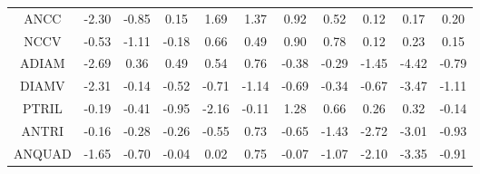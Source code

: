 \documentclass[11pt,a4paper]{report}
\begin{document}
\begin{longtable}{ | c || c | c | c | c | c | c | c | c | c || c |}
ANCC &  \cellcolor[HTML]{FFC7C7} -2.30 &  \cellcolor[HTML]{FFE7E7} -0.85 &  \cellcolor[HTML]{FFFFFF} 0.15 &  \cellcolor[HTML]{D7D7FF} 1.69 &  \cellcolor[HTML]{DFDFFF} 1.37 &  \cellcolor[HTML]{E7E7FF} 0.92 &  \cellcolor[HTML]{EFEFFF} 0.52 &  \cellcolor[HTML]{FFFFFF} 0.12 &  \cellcolor[HTML]{F7F7FF} 0.17 &  \cellcolor[HTML]{F7F7FF} 0.20 \\
NCCV &  \cellcolor[HTML]{FFEFEF} -0.53 &  \cellcolor[HTML]{FFE7E7} -1.11 &  \cellcolor[HTML]{FFF7F7} -0.18 &  \cellcolor[HTML]{EFEFFF} 0.66 &  \cellcolor[HTML]{EFEFFF} 0.49 &  \cellcolor[HTML]{E7E7FF} 0.90 &  \cellcolor[HTML]{EFEFFF} 0.78 &  \cellcolor[HTML]{FFFFFF} 0.12 &  \cellcolor[HTML]{F7F7FF} 0.23 &  \cellcolor[HTML]{FFFFFF} 0.15 \\
ADIAM &  \cellcolor[HTML]{FFBFBF} -2.69 &  \cellcolor[HTML]{F7F7FF} 0.36 &  \cellcolor[HTML]{EFEFFF} 0.49 &  \cellcolor[HTML]{EFEFFF} 0.54 &  \cellcolor[HTML]{EFEFFF} 0.76 &  \cellcolor[HTML]{FFF7F7} -0.38 &  \cellcolor[HTML]{FFF7F7} -0.29 &  \cellcolor[HTML]{FFD7D7} -1.45 &  \cellcolor[HTML]{FF8F8F} -4.42 &  \cellcolor[HTML]{FFEFEF} -0.79 \\
DIAMV &  \cellcolor[HTML]{FFC7C7} -2.31 &  \cellcolor[HTML]{FFFFFF} -0.14 &  \cellcolor[HTML]{FFEFEF} -0.52 &  \cellcolor[HTML]{FFEFEF} -0.71 &  \cellcolor[HTML]{FFDFDF} -1.14 &  \cellcolor[HTML]{FFEFEF} -0.69 &  \cellcolor[HTML]{FFF7F7} -0.34 &  \cellcolor[HTML]{FFEFEF} -0.67 &  \cellcolor[HTML]{FFA7A7} -3.47 &  \cellcolor[HTML]{FFE7E7} -1.11 \\
PTRIL &  \cellcolor[HTML]{FFF7F7} -0.19 &  \cellcolor[HTML]{FFF7F7} -0.41 &  \cellcolor[HTML]{FFE7E7} -0.95 &  \cellcolor[HTML]{FFC7C7} -2.16 &  \cellcolor[HTML]{FFFFFF} -0.11 &  \cellcolor[HTML]{DFDFFF} 1.28 &  \cellcolor[HTML]{EFEFFF} 0.66 &  \cellcolor[HTML]{F7F7FF} 0.26 &  \cellcolor[HTML]{F7F7FF} 0.32 &  \cellcolor[HTML]{FFFFFF} -0.14 \\
ANTRI &  \cellcolor[HTML]{FFF7F7} -0.16 &  \cellcolor[HTML]{FFF7F7} -0.28 &  \cellcolor[HTML]{FFF7F7} -0.26 &  \cellcolor[HTML]{FFEFEF} -0.55 &  \cellcolor[HTML]{EFEFFF} 0.73 &  \cellcolor[HTML]{FFEFEF} -0.65 &  \cellcolor[HTML]{FFDFDF} -1.43 &  \cellcolor[HTML]{FFB7B7} -2.72 &  \cellcolor[HTML]{FFB7B7} -3.01 &  \cellcolor[HTML]{FFE7E7} -0.93 \\
ANQUAD &  \cellcolor[HTML]{FFD7D7} -1.65 &  \cellcolor[HTML]{FFEFEF} -0.70 &  \cellcolor[HTML]{FFFFFF} -0.04 &  \cellcolor[HTML]{FFFFFF} 0.02 &  \cellcolor[HTML]{EFEFFF} 0.75 &  \cellcolor[HTML]{FFFFFF} -0.07 &  \cellcolor[HTML]{FFE7E7} -1.07 &  \cellcolor[HTML]{FFC7C7} -2.10 &  \cellcolor[HTML]{FFA7A7} -3.35 &  \cellcolor[HTML]{FFE7E7} -0.91 \\

\end{longtable}
\end{document}
